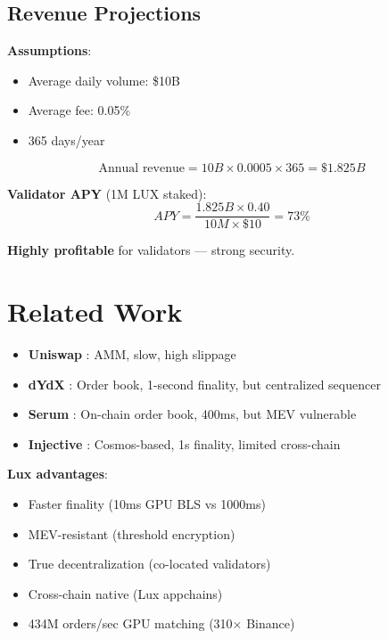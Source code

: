 \documentclass[11pt,letterpaper]{article}
\begin{document}
\subsection{Revenue Projections}

\textbf{Assumptions}:
\begin{itemize}
    \item Average daily volume: \$10B
    \item Average fee: 0.05\%
    \item 365 days/year
\end{itemize}

\begin{equation}
\text{Annual revenue} = 10B \times 0.0005 \times 365 = \$1.825B
\end{equation}

\textbf{Validator APY} (1M LUX staked):
\begin{equation}
APY = \frac{1.825B \times 0.40}{10M \times \$10} = 73\%
\end{equation}

\textbf{Highly profitable} for validators --- strong security.

\section{Related Work}

\begin{itemize}
    \item \textbf{Uniswap} \cite{adams2020}: AMM, slow, high slippage
    \item \textbf{dYdX} \cite{dydx2021}: Order book, 1-second finality, but centralized sequencer
    \item \textbf{Serum} \cite{serum2020}: On-chain order book, 400ms, but MEV vulnerable
    \item \textbf{Injective} \cite{injective2021}: Cosmos-based, 1s finality, limited cross-chain
\end{itemize}

\textbf{Lux advantages}:
\begin{itemize}
    \item Faster finality (10ms GPU BLS vs 1000ms)
    \item MEV-resistant (threshold encryption)
    \item True decentralization (co-located validators)
    \item Cross-chain native (Lux appchains)
    \item 434M orders/sec GPU matching (310$\times$ Binance)
\end{itemize}
\end{document}
